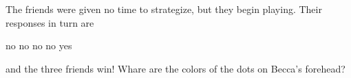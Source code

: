 \begin{enumerate}
        The friends were given no time to strategize, 
        but they begin playing. Their responses in turn are
        \begin{center}
            no 
            \hspace{2ex}
            no 
            \hspace{2ex}
            no 
            \hspace{2ex}
            no 
            \hspace{2ex}
            yes
        \end{center}
        and the three friends win! 
        Whare are the colors of the dots on Becca's forehead?

\end{enumerate}



